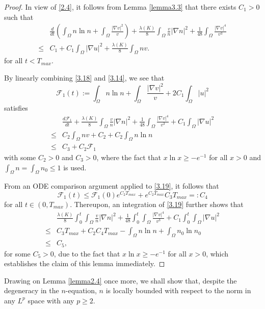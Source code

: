 \documentclass[12pt]{article}
\theoremstyle{plain}
\theoremstyle{definition}
\numberwithin{equation}{section}
\begin{document}
\begin{proof}[Proof]
In view of \eqref{2.4}, it follows from Lemma \ref{lemma3.3} that
there exists $C_1>0$  such that
 \begin{equation}\label{3.18}
\begin{split}
&\frac d{dt} (\int_\Omega n\ln n+\int_\Omega  \frac{|\nabla v|^2}v)+
\frac{\lambda(K)} 8\int_\Omega\frac{v}{n}|\nabla n|^2+
\frac1{48}
\int_\Omega \frac{|\nabla v|^4}{v^3}
\\
\leq &
C_1+ C_1\int_\Omega  |\nabla u|^2
+\frac{\lambda(K)}8\int_\Omega nv.
\end{split}
\end{equation}
for all  $t<T_{max}$.

By linearly combining \eqref{3.18} and \eqref{3.14}, we see that
$$\mathcal{F}_1(t):=\int_\Omega n\ln n+ \int_\Omega  \frac{|\nabla v|^2}v+2C_1\int_\Omega |u|^2
$$
satisfies
\begin{equation}\label{3.19}
\begin{split}
&\frac {d\mathcal{F}_1}{dt} +
\frac{\lambda(K)} 8\int_\Omega\frac{v}{n}|\nabla n|^2+
\frac1{48}
\int_\Omega \frac{|\nabla v|^4}{v^3}
+
C_1\int_\Omega |\nabla u|^2
\\
\leq &  C_2\int_\Omega nv+C_2+C_2 \int_\Omega n\ln n\\
\leq &  C_3+C_2\mathcal{F}_1
\end{split}
\end{equation}
with some  $C_2>0$ and  $C_3>0$, where the fact that $x\ln x\geq -e^{-1} $ for all $x>0$ and $\int_\Omega n=\int_\Omega n_0\leq 1$ is used.

From an ODE comparison argument applied to \eqref{3.19}, it follows that
$$
\mathcal{F}_1(t)\leq \mathcal{F}_1(0)e^{C_2T_{max}} +e^{C_2T_{max}} C_3T_{max} =:C_4
$$
for all  $t\in (0,T_{max})$.
Thereupon, an integration of \eqref{3.19} further shows that
\begin{equation*}
\begin{split}
&\frac{\lambda(K)} 8\int^t_0\int_\Omega\frac{v}{n}|\nabla n|^2+
\frac1{48}
\int^t_0\int_\Omega \frac{|\nabla v|^4}{v^3}
+
C_1\int^t_0\int_\Omega |\nabla u|^2\\
\leq  & C_3T_{max}+C_2 C_4 T_{max}-\int_\Omega  n\ln n+\int_\Omega  n_0\ln n_0\\
\leq  & C_5,
\end{split}
\end{equation*}
for some  $C_5>0$, due to the fact that $x\ln x\geq -e^{-1} $ for all $x>0$, which establishes the claim of this lemma immediately.
\end{proof}
\vskip4mm
Drawing on Lemma \ref{lemma2.4} once more, we shall show that, despite the degeneracy in the $n$-equation, $n$ is locally bounded with respect to the norm in any $L^p$ space with any $p\geq 2$.
\end{document}
